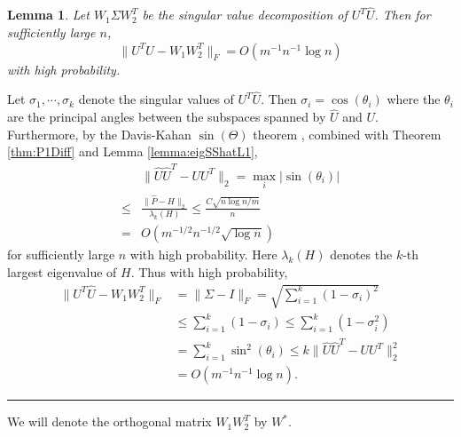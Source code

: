 \documentclass[a4paper]{article}
\newenvironment{proof}{{\bf Proof:  }}{\hfill\rule{2mm}{2mm}}
\newtheorem{lemma}[fact]{Lemma}
\renewcommand{\hat}{\widehat}
\begin{document}
\begin{lemma}
\label{lemma:AlmostOrthogonalL1}
Let $W_1 \Sigma W_2^T$ be the singular value decomposition of $U^T \hat{U}$. Then for sufficiently large $n$, 
\[
	\| U^T \hat{U} - W_1 W_2^T \|_F = O(m^{-1} n^{-1} \log n)
\]
with high probability.
\end{lemma}
\begin{proof}
Let $\sigma_1, \cdots, \sigma_k$ denote the singular values of $U^T \hat{U}$. Then $\sigma_i = \cos(\theta_i)$ where the $\theta_i$ are the principal angles between the subspaces spanned by $\hat{U}$ and $U$. Furthermore, by the Davis-Kahan $\sin(\Theta)$ theorem \citep{davis1970rotation}, combined with Theorem \ref{thm:P1Diff} and Lemma \ref{lemma:eigSShatL1},
\begin{equation}
\label{eqn:uhat2u2diffL1}
\begin{split}
	& \|\hat{U} \hat{U}^T - U U^T\|_2 = \max_i |\sin(\theta_i)| \\
    \le & \frac{\|\hat{P} - H\|_2}{\lambda_k(H)}
    \le \frac{C \sqrt{n \log n/m}}{n} \\
    = & O(m^{-1/2} n^{-1/2} \sqrt{\log n})
\end{split}
\end{equation}
for sufficiently large $n$ with high probability. Here $\lambda_k(H)$ denotes the $k$-th largest eigenvalue of $H$.
Thus with high probability, 
\begin{align*}
	\| U^T \hat{U} - W_1 W_2^T \|_F
    & = \| \Sigma - I \|_F
    = \sqrt{\sum_{i=1}^k (1-\sigma_i)^2} \\
    & \le \sum_{i=1}^k (1-\sigma_i) \le \sum_{i=1}^k (1-\sigma_i^2) \\
    & = \sum_{i=1}^k \sin^2(\theta_i)
    \le k \|\hat{U} \hat{U}^T - U U^T\|_2^2 \\
    & = O(m^{-1} n^{-1} \log n).
\end{align*}
\end{proof}

We will denote the orthogonal matrix $W_1 W_2^T$ by $W^*$.
\end{document}
